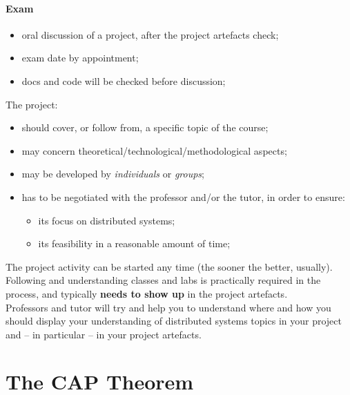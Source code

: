 \documentclass[11pt, a4paper]{article}
\begin{document}
\paragraph{Exam}\label{par:exam} %
\begin{itemize}
    \item oral discussion of a project, after the project artefacts check;
    \item exam date by appointment;
    \item docs and code will be checked before discussion;
\end{itemize}
The project:
\begin{itemize}
    \item should cover, or follow from, a specific topic of the course;
    \item may concern theoretical/technological/methodological aspects;
    \item may be developed by \textit{individuals} or \textit{groups};
    \item has to be negotiated with the professor and/or the tutor, in order to ensure:
        \begin{itemize}
            \item its focus on distributed systems;
            \item its feasibility in a reasonable amount of time;
        \end{itemize}
\end{itemize}
\begin{note}
    The project activity can be started any time (the sooner the better, usually).
    Following and understanding classes and labs is practically required in the process, and typically \textbf{needs to show up} in the project artefacts.
\\
Professors and tutor will try and help you to understand where and how you should display your understanding of distributed systems topics in your project and -- in particular -- in your project artefacts.
\end{note}
%
\section{The CAP Theorem}\label{sec:the_cap_theorem} %
%
\end{document}
